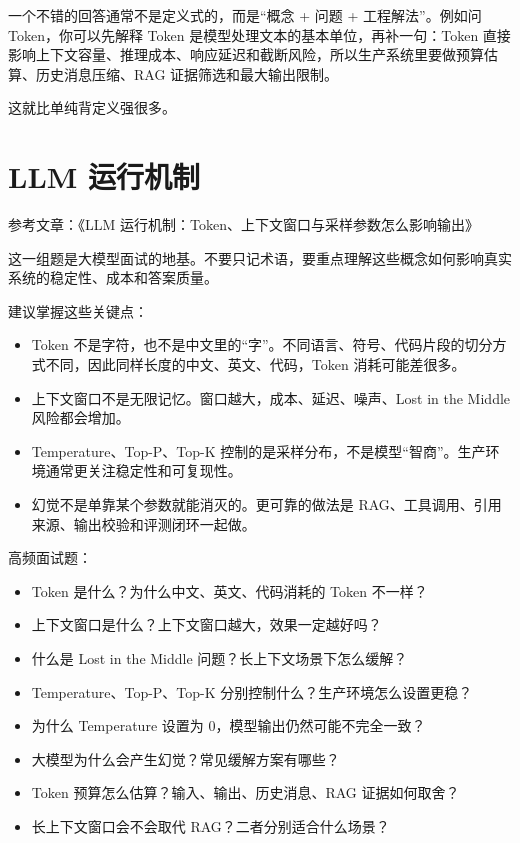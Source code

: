 \documentclass[9pt,a4paper,twocolumn]{ctexart}
\begin{document}
一个不错的回答通常不是定义式的，而是“概念 + 问题 + 工程解法”。例如问 Token，你可以先解释 Token 是模型处理文本的基本单位，再补一句：Token 直接影响上下文容量、推理成本、响应延迟和截断风险，所以生产系统里要做预算估算、历史消息压缩、RAG 证据筛选和最大输出限制。



这就比单纯背定义强很多。



\section*{LLM 运行机制}


参考文章：《LLM 运行机制：Token、上下文窗口与采样参数怎么影响输出》



这一组题是大模型面试的地基。不要只记术语，要重点理解这些概念如何影响真实系统的稳定性、成本和答案质量。



建议掌握这些关键点：


\begin{itemize}[itemsep=1pt, topsep=2pt]
  \item Token 不是字符，也不是中文里的“字”。不同语言、符号、代码片段的切分方式不同，因此同样长度的中文、英文、代码，Token 消耗可能差很多。
  \item 上下文窗口不是无限记忆。窗口越大，成本、延迟、噪声、Lost in the Middle 风险都会增加。
  \item Temperature、Top-P、Top-K 控制的是采样分布，不是模型“智商”。生产环境通常更关注稳定性和可复现性。
  \item 幻觉不是单靠某个参数就能消灭的。更可靠的做法是 RAG、工具调用、引用来源、输出校验和评测闭环一起做。
\end{itemize}


高频面试题：


\begin{itemize}[itemsep=1pt, topsep=2pt]
  \item Token 是什么？为什么中文、英文、代码消耗的 Token 不一样？
  \item 上下文窗口是什么？上下文窗口越大，效果一定越好吗？
  \item 什么是 Lost in the Middle 问题？长上下文场景下怎么缓解？
  \item Temperature、Top-P、Top-K 分别控制什么？生产环境怎么设置更稳？
  \item 为什么 Temperature 设置为 0，模型输出仍然可能不完全一致？
  \item 大模型为什么会产生幻觉？常见缓解方案有哪些？
  \item Token 预算怎么估算？输入、输出、历史消息、RAG 证据如何取舍？
  \item 长上下文窗口会不会取代 RAG？二者分别适合什么场景？
\end{itemize}
\end{document}
